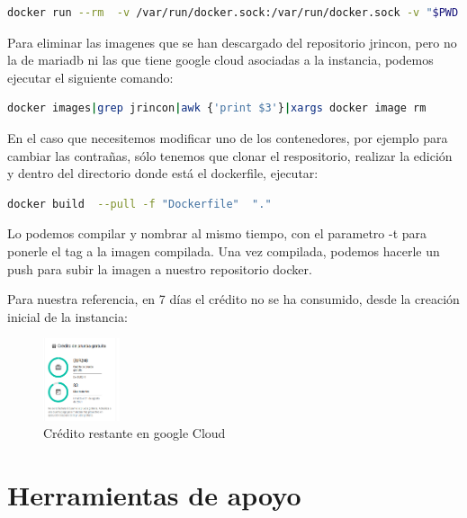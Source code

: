 \documentclass[11pt,spanish,listoffigures,listoftables]{tfgetsinf}
\begin{document}
\begin{lstlisting}[language=bash, caption={Comando docker para parar docker-compose}]
docker run --rm  -v /var/run/docker.sock:/var/run/docker.sock -v "$PWD:$PWD"   -w="$PWD"  docker/compose:1.24.0 down
\end{lstlisting}

Para eliminar las imagenes que se han descargado del repositorio jrincon, pero no la de mariadb ni las que tiene google cloud asociadas a la instancia, podemos ejecutar el siguiente comando:

\begin{lstlisting}[language=bash, caption={Borrado de imágenes con el texto jrincon}]
  docker images|grep jrincon|awk {'print $3'}|xargs docker image rm
\end{lstlisting}

En el caso que necesitemos modificar uno de los contenedores, por ejemplo para cambiar las contrañas, sólo tenemos que clonar el respositorio, realizar la edición y dentro del directorio donde está el dockerfile, ejecutar:

\begin{lstlisting}[language=bash, caption={Comando docker para construir una imagen}]
  docker build  --pull -f "Dockerfile"  "."
\end{lstlisting}

Lo podemos compilar y nombrar al mismo tiempo, con el parametro -t para ponerle el tag a la imagen compilada. Una vez compilada, podemos hacerle un push para subir la imagen a nuestro repositorio docker.

Para nuestra referencia, en 7 días el crédito no se ha consumido, desde la creación inicial de la instancia:

\begin{figure}[h!] %
  \centering
   \includegraphics[width=0.20\textwidth]{img/Credito.png}
   \caption{Crédito restante en google Cloud}
   \label{fig:creditogoogle}
 \end{figure}

\chapter{Herramientas de apoyo}
\end{document}
